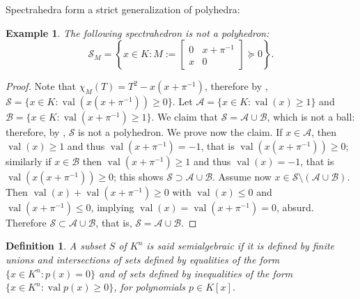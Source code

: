 \documentclass[sigconf]{acmart}
\newtheorem{definition}[theorem]{Definition}
\newtheorem{example}[theorem]{Example}
\DeclareMathOperator{\val}{val}
\begin{document}
Spectrahedra form a strict generalization of polyhedra:

\begin{example}
  The following spectrahedron is not a polyhedron:
  \[
  \mathcal{S}_M = \left\{x \in K : M := \begin{bmatrix} 0 & x + \pi^{-1} \\ x & 0 \end{bmatrix} \succeq 0\right\}.
  \] 
\end{example}
\begin{proof}
  Note that
  $\chi_M(T) = T^2-x(x+\pi^{-1})$, therefore by ,
  $\mathcal{S} = \{x \in K : \val(x(x + \pi^{-1})) \geq 0\}$.
  Let $\mathcal{A} = \{x \in K : \val(x) \geq 1\}$ and
  $\mathcal{B} = \{x \in K : \val(x+\pi^{-1}) \geq 1\}$.
  We claim that $\mathcal{S} = \mathcal{A} \cup \mathcal{B}$, which is not
  a ball: therefore, by , $\mathcal{S}$ is not a polyhedron.
  We prove now the claim. If $x \in \mathcal{A}$, then $\val(x)\geq 1$ and
  thus $\val(x+\pi^{-1})=-1$, that is $\val(x(x+\pi^{-1})) \geq 0$; similarly
  if $x \in \mathcal{B}$ then $\val(x+\pi^{-1}) \geq 1$ and thus $\val(x) = -1$,
  that is $\val(x(x+\pi^{-1})) \geq 0$; this shows $\mathcal{S} \supset \mathcal{A}
  \cup \mathcal{B}$. Assume now $x \in \mathcal{S} \setminus (\mathcal{A} \cup
  \mathcal{B})$. Then $\val(x)+\val(x+\pi^{-1}) \geq 0$ with $\val(x) \leq 0$
  and $\val(x+\pi^{-1}) \leq 0$, implying $\val(x) = \val(x+\pi^{-1}) = 0$, absurd.
  Therefore $\mathcal{S} \subset \mathcal{A} \cup \mathcal{B}$, that is,
  $\mathcal{S} = \mathcal{A} \cup \mathcal{B}$.
\end{proof}

\begin{definition}
  A subset $S$ of $K^n$ is said \emph{semialgebraic} if it is defined by finite unions and intersections
  of sets defined by equalities of the form $\{x \in K^n  : p(x) = 0\}$
  and of sets defined by inequalities of the form $\{ x\in K^n : \val p(x) \geq 0\}$, for polynomials
  $p \in K[x]$.
\end{definition}
\end{document}
